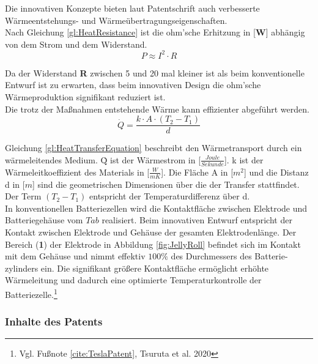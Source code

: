 Die innovativen Konzepte bieten laut Patentschrift auch verbesserte Wärmeentstehungs- und Wärmeübertragungseigenschaften.\\
Nach Gleichung \ref{gl:HeatResistance} ist die ohm'sche Erhitzung in [\textbf{W}] abhängig von dem Strom und dem Widerstand. 
\begin{equation}
	 P \approx I^{2} \cdot R
	 \label{gl:HeatResistance}
\end{equation}

Da der Widerstand \textbf{R} zwischen 5 und 20 mal kleiner ist als beim konventionelle Entwurf ist zu erwarten, dass beim innovativen Design die ohm'sche Wärmeproduktion signifikant reduziert ist.\\
Die trotz der Maßnahmen entstehende Wärme kann effizienter abgeführt werden.
\begin{equation}
	\dot{Q} = \frac{k\cdot A\cdot (T_{2} - T_{1})}{d} 
	\label{gl:HeatTransferEquation}
\end{equation}

Gleichung \ref{gl:HeatTransferEquation} beschreibt den Wärmetransport durch ein wärmeleitendes Medium. \.{Q} ist der Wärmestrom in [\textbf{$\frac{Joule}{Sekunde}$}]. k ist der Wärmeleitkoeffizient des Materials in [\textbf{$\frac{W}{mK}$}].
Die Fläche A in [\textbf{$m^{2}$}] und die Distanz d in [\textbf{$m$}] sind die geometrischen Dimensionen über die der Transfer stattfindet. Der Term $(T_{2}-T_{1})$ entspricht der Temperaturdifferenz über d.\\
In konventionellen Batteriezellen wird die Kontaktfläche zwischen Elektrode und Batteriegehäuse vom $Tab$ realisiert. Beim innovativen Entwurf entspricht der Kontakt zwischen Elektrode und Gehäuse der gesamten Elektrodenlänge. Der Bereich (\textbf{1}) der Elektrode in Abbildung \ref{fig:JellyRoll} befindet sich im Kontakt mit dem Gehäuse und nimmt effektiv $100\percent$ des Durchmessers des Batterie-\newline zylinders ein. Die signifikant größere Kontaktfläche ermöglicht erhöhte Wärmeleitung und dadurch eine optimierte Temperaturkontrolle der Batteriezelle.\footnote{Vgl. Fußnote \ref{cite:TeslaPatent}, Tsuruta et al. 2020}\\

\subsubsection*{Inhalte des Patents}\label{subsub:PatentContents}

